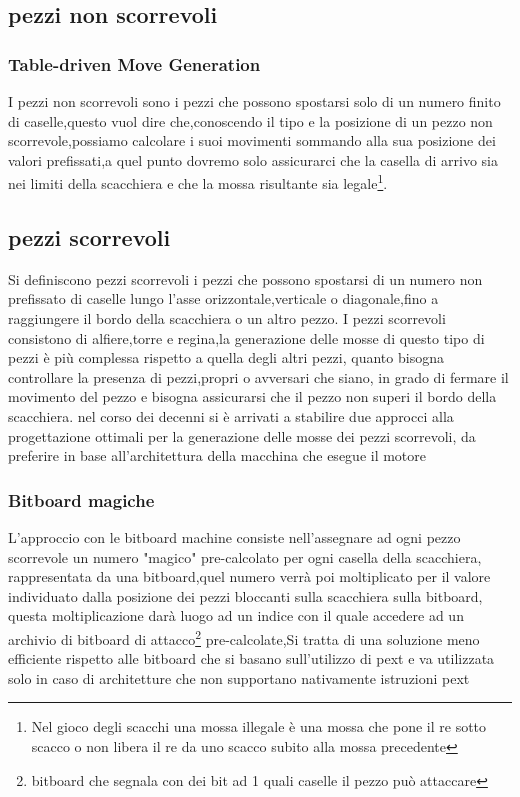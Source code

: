 \subsection{pezzi non scorrevoli}
\subsubsection{Table-driven Move Generation}
I pezzi non scorrevoli sono i pezzi che possono spostarsi solo di un numero finito di caselle,questo vuol dire che,conoscendo il tipo e la posizione di un pezzo non scorrevole,possiamo calcolare i suoi movimenti
sommando alla sua posizione dei valori prefissati,a quel punto dovremo solo assicurarci che la casella di arrivo sia nei limiti della scacchiera e che la mossa risultante sia legale\footnote{Nel gioco degli scacchi una mossa illegale è una mossa che pone il re sotto scacco o non libera il re da uno scacco subito alla mossa precedente}.

\subsection{pezzi  scorrevoli}
Si definiscono pezzi scorrevoli i pezzi che possono spostarsi di un numero non prefissato di caselle lungo l'asse orizzontale,verticale o diagonale,fino a raggiungere il bordo della scacchiera o un altro pezzo.
I pezzi scorrevoli consistono di alfiere,torre e regina,la generazione delle mosse di questo tipo di pezzi è più complessa rispetto a quella degli altri pezzi, quanto bisogna controllare la presenza di pezzi,propri
o avversari che siano, in grado di fermare il movimento del pezzo e bisogna assicurarsi che il pezzo non superi il bordo della scacchiera.
nel corso  dei decenni si è arrivati a stabilire due approcci alla progettazione ottimali per la generazione delle mosse dei pezzi scorrevoli, 
da preferire in base all'architettura della macchina che esegue il motore

\subsubsection{ Bitboard magiche}
L'approccio con le bitboard machine consiste nell'assegnare ad ogni pezzo scorrevole un numero "magico" pre-calcolato per ogni casella della scacchiera, rappresentata da una bitboard,quel numero verrà poi moltiplicato
 per il valore individuato dalla posizione dei pezzi bloccanti sulla scacchiera sulla bitboard,
questa moltiplicazione darà luogo ad un indice con il quale accedere ad un archivio di bitboard di 
attacco\footnote{bitboard che segnala con dei bit ad 1 quali caselle il pezzo può attaccare} pre-calcolate,Si tratta di una soluzione meno efficiente rispetto alle bitboard che si basano sull'utilizzo di pext
e va utilizzata solo in caso di architetture che non supportano nativamente istruzioni pext



